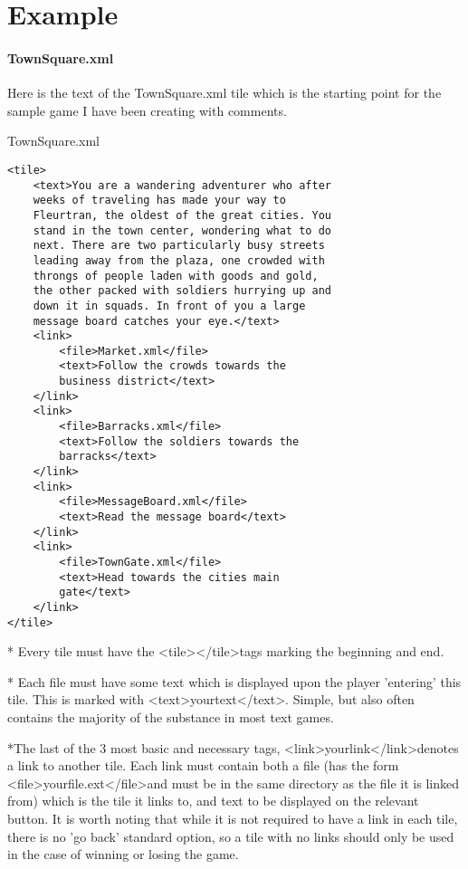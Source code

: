 \documentclass[11pt]{article}
\begin{document}
\section{Example}

\paragraph{TownSquare.xml}

Here is the text of the TownSquare.xml tile which is the starting point for the sample game I have been creating with comments.

TownSquare.xml
\begin{lstlisting}[frame=single]
<tile>
	<text>You are a wandering adventurer who after 
	weeks of traveling has made your way to 
	Fleurtran, the oldest of the great cities. You 
	stand in the town center, wondering what to do 
	next. There are two particularly busy streets 
	leading away from the plaza, one crowded with 
	throngs of people laden with goods and gold, 
	the other packed with soldiers hurrying up and 
	down it in squads. In front of you a large 
	message board catches your eye.</text>
	<link>
		<file>Market.xml</file>
		<text>Follow the crowds towards the 
		business district</text>
	</link>
	<link>
		<file>Barracks.xml</file>
		<text>Follow the soldiers towards the 
		barracks</text>
	</link>
	<link>
		<file>MessageBoard.xml</file>
		<text>Read the message board</text>
	</link>
	<link>
		<file>TownGate.xml</file>
		<text>Head towards the cities main 
		gate</text>
	</link>
</tile>
\end{lstlisting}
* Every tile must have the \textless tile\textgreater \textless /tile\textgreater tags marking the beginning and end.

* Each file must have some text which is displayed upon the player 'entering' this tile. This is marked with \textless text\textgreater yourtext\textless /text\textgreater . Simple, but also often contains the majority of the substance in most text games.

*The last of the 3 most basic and necessary tags, \textless link\textgreater yourlink\textless /link\textgreater  denotes a link to another tile. Each link must contain both a file (has the form \textless file\textgreater yourfile.ext\textless /file\textgreater and must be in the same directory as the file it is linked from) which is the tile it links to, and text to be displayed on the relevant button. It is worth noting that while it is not required to have a link in each tile, there is no 'go back' standard option, so a tile with no links should only be used in the case of winning or losing the game.
\end{document}
